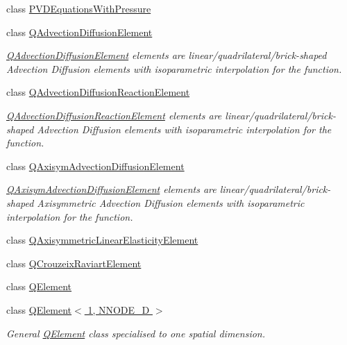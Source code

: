 \begin{DoxyCompactItemize}
class \hyperlink{classoomph_1_1PVDEquationsWithPressure}{P\+V\+D\+Equations\+With\+Pressure}
\item 
class \hyperlink{classoomph_1_1QAdvectionDiffusionElement}{Q\+Advection\+Diffusion\+Element}
\begin{DoxyCompactList}\small\item\em \hyperlink{classoomph_1_1QAdvectionDiffusionElement}{Q\+Advection\+Diffusion\+Element} elements are linear/quadrilateral/brick-\/shaped Advection Diffusion elements with isoparametric interpolation for the function. \end{DoxyCompactList}\item 
class \hyperlink{classoomph_1_1QAdvectionDiffusionReactionElement}{Q\+Advection\+Diffusion\+Reaction\+Element}
\begin{DoxyCompactList}\small\item\em \hyperlink{classoomph_1_1QAdvectionDiffusionReactionElement}{Q\+Advection\+Diffusion\+Reaction\+Element} elements are linear/quadrilateral/brick-\/shaped Advection Diffusion elements with isoparametric interpolation for the function. \end{DoxyCompactList}\item 
class \hyperlink{classoomph_1_1QAxisymAdvectionDiffusionElement}{Q\+Axisym\+Advection\+Diffusion\+Element}
\begin{DoxyCompactList}\small\item\em \hyperlink{classoomph_1_1QAxisymAdvectionDiffusionElement}{Q\+Axisym\+Advection\+Diffusion\+Element} elements are linear/quadrilateral/brick-\/shaped Axisymmetric Advection Diffusion elements with isoparametric interpolation for the function. \end{DoxyCompactList}\item 
class \hyperlink{classoomph_1_1QAxisymmetricLinearElasticityElement}{Q\+Axisymmetric\+Linear\+Elasticity\+Element}
\item 
class \hyperlink{classoomph_1_1QCrouzeixRaviartElement}{Q\+Crouzeix\+Raviart\+Element}
\item 
class \hyperlink{classoomph_1_1QElement}{Q\+Element}
\item 
class \hyperlink{classoomph_1_1QElement_3_011_00_01NNODE__1D_01_4}{Q\+Element$<$ 1, N\+N\+O\+D\+E\+\_\+D $>$}
\begin{DoxyCompactList}\small\item\em General \hyperlink{classoomph_1_1QElement}{Q\+Element} class specialised to one spatial dimension. \end{DoxyCompactList}\item 

\end{DoxyCompactItemize}
